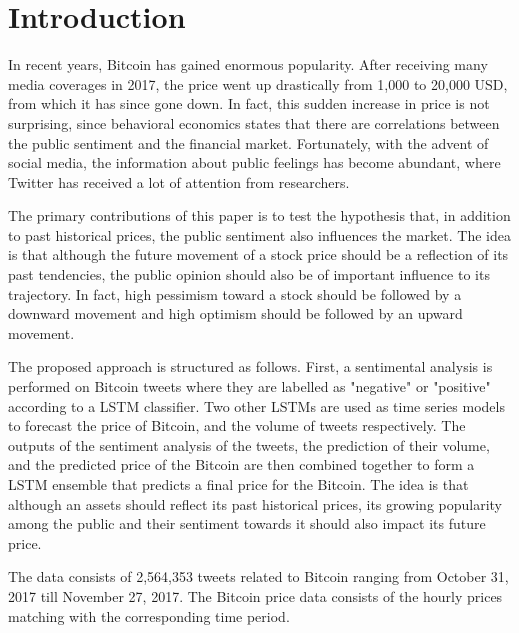 \documentclass[conference]{IEEEtran}
\begin{document}
\section{Introduction}
\par In recent years, Bitcoin has gained enormous popularity. After receiving many media coverages in 2017, the price went up drastically from 1,000 to 20,000 USD, from which it has since gone down. In fact, this sudden increase in price is not surprising, since behavioral economics states that there are correlations between the public sentiment and the financial market. Fortunately, with the advent of social media, the information about public feelings has become abundant, where Twitter has received a lot of attention from researchers.
\par The primary contributions of this paper is to test the hypothesis that, in addition to past historical prices, the public sentiment also influences the market. The idea is that although the future movement of a stock price should be a reflection of its past tendencies, the public opinion should also be of important influence to its trajectory. In fact, high pessimism toward a stock should be followed by a downward movement and high optimism should be followed by an upward movement. 
\par The proposed approach is structured as follows. First, a sentimental analysis is  performed on Bitcoin tweets where they are labelled as "negative" or "positive" according to a LSTM classifier. Two other LSTMs are used as time series models to forecast the price of Bitcoin, and the volume of tweets respectively. The outputs of the sentiment analysis of the tweets, the prediction of their volume, and the predicted price of the Bitcoin are then combined together to form a LSTM ensemble that predicts a final price for the Bitcoin. The idea is that although an assets should reflect its past historical prices, its growing popularity among the public and their sentiment towards it should also impact its future price.
\par	 The data consists of 2,564,353 tweets related to Bitcoin ranging from October 31, 2017 till November 27, 2017.    The Bitcoin price data consists of the hourly prices matching with the corresponding time period.
	 
\end{document}
